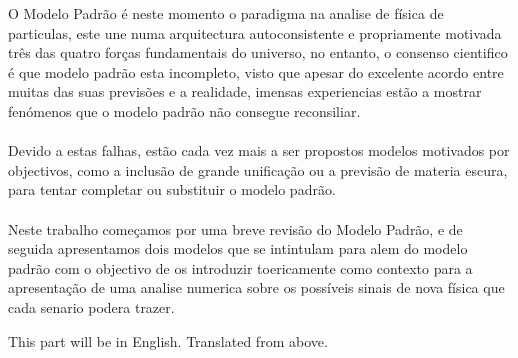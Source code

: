 \documentclass[10pt]{report}
\renewcommand{\(}{\left(}
\renewcommand{\)}{\right)}
\renewcommand{\[}{\left[}
\renewcommand{\]}{\right]}
\begin{document}
\TitlePage
  \vspace*{55mm}
       {O Modelo Padrão é neste momento o paradigma na analise de física de particulas, este une numa arquitectura autoconsistente e propriamente motivada três das quatro forças fundamentais do universo, no entanto, o consenso cientifico é que modelo padrão esta incompleto, visto que apesar do excelente acordo entre muitas das suas previsões e a realidade, imensas experiencias estão a mostrar fenómenos que o modelo padrão não consegue reconsiliar. 
\\ \ \\ 
Devido a estas falhas, estão cada vez mais a ser propostos modelos motivados por objectivos, como a inclusão de grande unificação ou a previsão de materia escura, para tentar completar ou substituir o modelo padrão. \\
\ \\
Neste trabalho começamos por uma breve revisão do Modelo Padrão, e de seguida apresentamos dois modelos que se intintulam para alem do modelo padrão com o objectivo de os introduzir toericamente como contexto para a apresentação de uma analise numerica sobre os possíveis sinais de nova física que cada senario podera trazer.  
       }
\EndTitlePage
\titlepage\ \endtitlepage %

\TitlePage
  \vspace*{55mm}
       {
       This part will be in English. Translated from above. 
       }
\EndTitlePage
\titlepage\ \endtitlepage %


\tableofcontents

\cleardoublepage
\listoffigures

\cleardoublepage
\listoftables

\cleardoublepage

\setcounter{page}{1}





\end{document}
